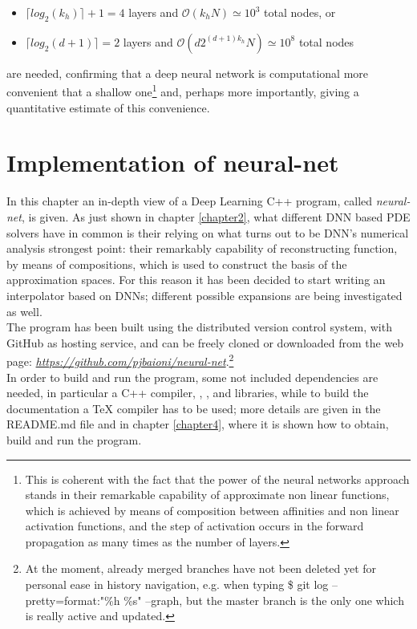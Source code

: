 \documentclass[12pt, a4paper]{report}
\theoremstyle{definition}
\begin{document}
\begin{itemize}
	\item $\lceil log_2 (k_h)\rceil +1=4$ layers and $\mathcal O(k_hN)\simeq 10^3$ total nodes, or
	\item $\lceil log_2(d+1) \rceil = 2$ layers and $\mathcal O(d2^{(d+1)k_h}N)\simeq 10^8$ total nodes
\end{itemize}
are needed, confirming that a deep neural network is computational more convenient that a shallow one\footnote{This is coherent with the fact that the power of the neural networks approach stands in their remarkable capability of approximate non linear functions, which is achieved by means of composition between affinities and non linear activation functions, and the step of activation occurs in the forward propagation as many times as the number of layers.} and, perhaps more importantly, giving a quantitative estimate of this convenience.\\




\chapter{Implementation of neural-net}\label{chapter3}
\setcounter{figure}{8}
In this chapter an in-depth view of a Deep Learning C++ program, called \textit{neural-net}, is given. As just shown in chapter \ref{chapter2}, what different DNN based PDE solvers have in common is their relying on what turns out to be DNN's numerical analysis strongest point: their remarkably capability of reconstructing function, by means of compositions, which is used to construct the basis of the approximation spaces. For this reason it has been decided to start writing an interpolator based on DNNs; different possible expansions are being investigated as well.\\
The program has been built using the \cite{git} distributed version control system, with GitHub as hosting service, and can be freely cloned or downloaded from the web page: \href{https://github.com/pjbaioni/neural-net}{\emph{https://github.com/pjbaioni/neural-net}}.\footnote{At the moment, already merged branches have not been deleted yet for personal ease in history navigation, e.g. when typing {\ttfamily \$ git log --pretty=format:"\%h \%s" --graph}, but the master branch is the only one which is really active and updated.}\\
In order to build and run the program, some not included dependencies are needed, in particular a C++ compiler, \cite{make}, \cite{gnuplot}, \cite{eigen} and \cite{boost} libraries, while to build the documentation a TeX compiler has to be used; more details are given in the README.md file and in chapter \ref{chapter4}, where it is shown how to obtain, build and run the program. 
\newpage
\end{document}
